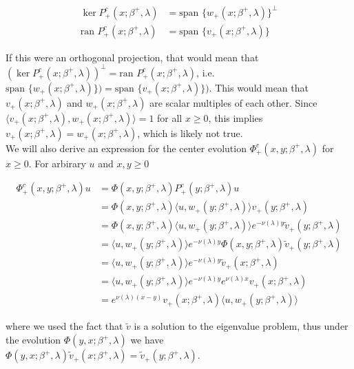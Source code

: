 \documentclass[12pt]{article}
\begin{document}
\begin{align*}
\ker P^c_+(x; \beta^+, \lambda) &= \text{span }\{ w_+(x; \beta^+, \lambda) \}^\perp\\
\text{ran } P^c_+(x; \beta^+, \lambda) &= \text{span }\{ v_+(x; \beta^+, \lambda) \}
\end{align*}

If this were an orthogonal projection, that would mean that $(\ker P^c_+(x; \beta^+, \lambda))^\perp = \text{ran } P^c_+(x; \beta^+, \lambda)$, i.e. $\text{span }\{ w_+(x; \beta^+, \lambda) \}) = \text{span }\{ v_+(x; \beta^+, \lambda) \})$. This would mean that $v_+(x; \beta^+, \lambda)$ and $w_+(x; \beta^+, \lambda)$ are scalar multiples of each other. Since $\langle v_+(x; \beta^+, \lambda), w_+(x; \beta^+, \lambda) \rangle = 1$ for all $x \geq 0$, this implies $v_+(x; \beta^+, \lambda) = w_+(x; \beta^+, \lambda)$, which is likely not true. \\

We will also derive an expression for the center evolution $\Phi^c_+(x,y; \beta^+, \lambda)$ for $x \geq 0$. For arbirary $u$ and $x, y \geq 0$

\begin{align*}
\Phi^c_+(x,y; \beta^+, \lambda)u &= \Phi(x,y; \beta^+, \lambda) P^c_+(y; \beta^+, \lambda) u \\
&= \Phi(x,y; \beta^+, \lambda) \langle u, w_+(y; \beta^+, \lambda) \rangle v_+(y; \beta^+, \lambda) \\
&= \Phi(x,y; \beta^+, \lambda) \langle u, w_+(y; \beta^+, \lambda) \rangle e^{-\nu(\lambda)y} \tilde{v}_+(y; \beta^+, \lambda) \\
&= \langle u, w_+(y; \beta^+, \lambda) \rangle e^{-\nu(\lambda)y} \Phi(x,y; \beta^+, \lambda) \tilde{v}_+(y; \beta^+, \lambda) \\
&= \langle u, w_+(y; \beta^+, \lambda) \rangle e^{-\nu(\lambda)y} \tilde{v}_+(x; \beta^+, \lambda) \\
&= \langle u, w_+(y; \beta^+, \lambda) \rangle e^{-\nu(\lambda)y} e^{\nu(\lambda)x} v_+(x; \beta^+, \lambda) \\
&= e^{\nu(\lambda)(x-y)} v_+(x; \beta^+, \lambda) \langle u, w_+(y; \beta^+, \lambda) \rangle 
\end{align*}

where we used the fact that $\tilde{v}$ is a solution to the eigenvalue problem, thus under the evolution $\Phi(y, x; \beta^+, \lambda)$ we have $\Phi(y, x; \beta^+, \lambda)\tilde{v}_+(x; \beta^+, \lambda) = \tilde{v}_+(y; \beta^+, \lambda)$.\\
\end{document}
